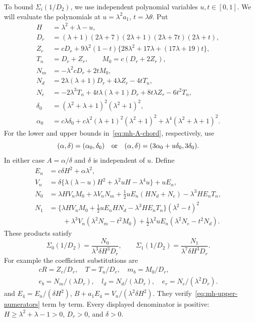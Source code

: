 To bound $\Sigma_i(1/D_2)$, we use independent polynomial variables $u,t\in[0,1]$. We will evaluate the polynomials at $u=\lambda^2a_1$, $t=\lambda\theta$. Put
\begin{align*}
 H&=\lambda^2+\lambda-u,\\
 D_r&=(\lambda+1)(2\lambda+7)(2\lambda+1)(2\lambda+7t)(2\lambda+t),\\
 Z_r&=cD_r+9\lambda^2(1-t)\{28\lambda^2+17\lambda+(17\lambda+19)t\},\\
 T_n&=D_r+Z_r,\qquad M_0=c(D_r+2Z_r),\\
 N_m&=-\lambda^2cD_r+2tM_0,\\
 N_d&=2\lambda(\lambda+1)D_r+4\lambda Z_r-4tT_n,\\
 N_e&=-2\lambda^3T_n+4t\lambda(\lambda+1)D_r+8t\lambda Z_r-6t^2T_n,\\
 \delta_0&=(\lambda^2+\lambda+1)^2(\lambda^2+1)^2,\\
 \alpha_0&=c\lambda\delta_0+c\lambda^2(\lambda+1)^2(\lambda^2+1)^2
                         +\lambda^4(\lambda^2+\lambda+1)^2.
\end{align*}
For the lower and upper bounds in~\eqref{eq:mh-A-chord}, respectively, use
\[
 (\alpha,\delta)=(\alpha_0,\delta_0)
 \quad\hbox{or}\quad
 (\alpha,\delta)=(3\alpha_0+u\delta_0,3\delta_0).
\]
In either case $A=\alpha/\delta$ and $\delta$ is independent of $u$. Define
\begin{align*}
 E_n&=c\delta H^2+\alpha\lambda^2,\\
 V_n&=\delta\{\lambda(\lambda-u)H^2+\lambda^2uH-\lambda^4u\}+uE_n,\\
 N_0&=\lambda HV_nM_0+\lambda V_nN_m
       +\tfrac12uE_n(HN_d+N_e)-\lambda^3HE_nT_n,\\
 N_1&=\{\lambda HV_nM_0+\tfrac12uE_nHN_d-\lambda^3HE_nT_n\}(\lambda^2-t)^2\\
    &\qquad+\lambda^3V_n(\lambda^2N_m-t^2M_0)
       +\tfrac12\lambda^2uE_n(\lambda^2N_e-t^2N_d).
\end{align*}
These products satisfy
\begin{equation}\label{eq:mh-upper-numerators}
 \Sigma_0(1/D_2)=\frac{N_0}{\lambda^3\delta H^3D_r},\qquad
 \Sigma_1(1/D_2)=\frac{N_1}{\lambda^7\delta H^3D_r}.
\end{equation}
For example the coefficient substitutions are
\[
 \begin{gathered}
 cR=Z_r/D_r,\quad T=T_n/D_r,\quad m_b=M_0/D_r,\\
 e_b=N_m/(\lambda D_r),\quad
 l_d=N_d/(\lambda D_r),\quad e_r=N_e/(\lambda^2D_r).
 \end{gathered}
\]
and $E_4=E_n/(\delta H^2)$, $B+a_1E_4=V_n/(\lambda^2\delta H^2)$.
They verify~\eqref{eq:mh-upper-numerators} term by term. Every displayed denominator is positive: $H\ge\lambda^2+\lambda-1>0$, $D_r>0$, and $\delta>0$.

